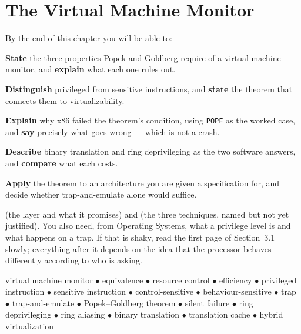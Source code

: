 \chapter{The Virtual Machine Monitor}\label{ch:vmm}

\begin{outcomes}
By the end of this chapter you will be able to:
\begin{tight}
  \item \textbf{State} the three properties Popek and Goldberg require of a
        virtual machine monitor, and \textbf{explain} what each one rules out.
  \item \textbf{Distinguish} privileged from sensitive instructions, and
        \textbf{state} the theorem that connects them to virtualizability.
  \item \textbf{Explain} why x86 failed the theorem's condition, using
        \texttt{POPF} as the worked case, and \textbf{say} precisely what goes
        wrong --- which is not a crash.
  \item \textbf{Describe} binary translation and ring deprivileging as the two
        software answers, and \textbf{compare} what each costs.
  \item \textbf{Apply} the theorem to an architecture you are given a
        specification for, and decide whether trap-and-emulate alone would
        suffice.
\end{tight}
\end{outcomes}

\begin{prereq}
 (the layer and what it promises) and  (the
three techniques, named but not yet justified). You also need, from Operating
Systems, what a privilege level is and what happens on a trap. If that is
shaky, read the first page of Section~3.1 slowly; everything after it depends
on the idea that the processor behaves differently according to who is asking.
\end{prereq}

\begin{keyterms}
virtual machine monitor $\bullet$ equivalence $\bullet$ resource control
$\bullet$ efficiency $\bullet$ privileged instruction $\bullet$ sensitive
instruction $\bullet$ control-sensitive $\bullet$ behaviour-sensitive $\bullet$
trap $\bullet$ trap-and-emulate $\bullet$ Popek--Goldberg theorem $\bullet$
silent failure $\bullet$ ring deprivileging $\bullet$ ring aliasing $\bullet$
binary translation $\bullet$ translation cache $\bullet$ hybrid virtualization
\end{keyterms}


